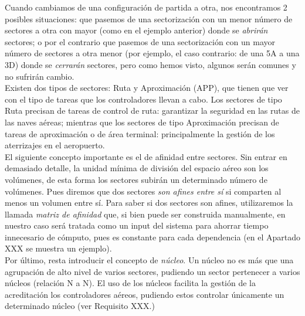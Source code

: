 Cuando cambiamos de una configuración de partida a otra, nos encontramos 2 posibles situaciones: que pasemos de una sectorización
con un menor número de sectores a otra con mayor (como en el ejemplo anterior) donde se \textit{abrirán} sectores; o por el
contrario que pasemos de una sectorización con un mayor número de sectores a otra menor (por ejemplo, el caso contrario: de una 5A a una 3D)
donde se \textit{cerrarán} sectores, pero como hemos visto, algunos serán comunes y no sufrirán cambio.
\\

Existen dos tipos de sectores: Ruta y Aproximación (APP), que tienen que ver con el tipo de tareas que los controladores llevan a cabo.
Los sectores de tipo Ruta precisan de tareas de control de ruta: garantizar la seguridad en las rutas de las naves aéreas; mientras que los sectores de tipo Aproximación precisan de tareas de aproximación o de área terminal: principalmente la gestión de los aterrizajes en el aeropuerto.
\\

El siguiente concepto importante es el de afinidad entre sectores. Sin entrar en demasiado detalle, la unidad mínima de
división del espacio aéreo son los volúmenes, de esta forma los sectores subirán un determinado número de volúmenes.
Pues diremos que dos sectores \textit{son afines entre sí} si comparten al menos un volumen entre sí. Para saber si dos
sectores son afines, utilizaremos la llamada \textit{matriz de afinidad} que, si bien puede ser construida manualmente,
en nuestro caso será tratada como un input del sistema para ahorrar tiempo innecesario de cómputo, pues es constante para
cada dependencia (en el Apartado XXX se muestra un ejemplo). %
\\

Por último, resta introducir el concepto de \textit{núcleo}. Un núcleo no es más que una agrupación de alto nivel de
varios sectores, pudiendo un sector pertenecer a varios núcleos (relación N a N). El uso de los núcleos facilita la
gestión de la acreditación los controladores aéreos, pudiendo estos controlar únicamente un determinado núcleo (ver Requisito XXX.) %



